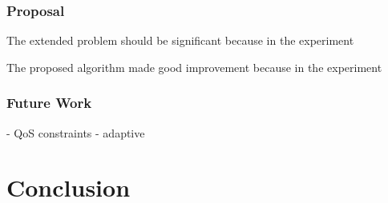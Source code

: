 \documentclass[senior,final,11pt]{iscs-thesis}
\begin{document}

\subsection{Proposal}
The extended problem should be significant because in the experiment

The proposed algorithm made good improvement because in the experiment 


\subsection{Future Work}
- QoS constraints
- adaptive


\chapter{Conclusion}

 
 
\end{document}
